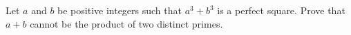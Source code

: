 Let $a$ and $b$ be positive integers such that $a^3+b^3$ is a perfect square. Prove that $a+b$ cannot be the product of two distinct primes.
